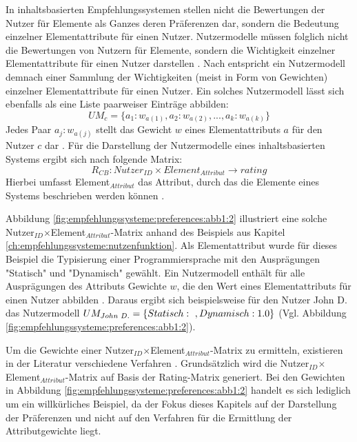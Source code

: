 In inhaltsbasierten Empfehlungssystemen stellen nicht die Bewertungen der Nutzer für Elemente als Ganzes deren Präferenzen dar, sondern die Bedeutung einzelner Elementattribute für einen Nutzer.
Nutzermodelle müssen folglich nicht die Bewertungen von Nutzern für Elemente, sondern die Wichtigkeit einzelner Elementattribute für einen Nutzer darstellen \cite[S. 42]{berkovsky:2:article}.
Nach \textcite[S. 42]{berkovsky:2:article} entspricht ein Nutzermodell demnach einer Sammlung der Wichtigkeiten (meist in Form von Gewichten) einzelner Elementattribute für einen Nutzer.
Ein solches Nutzermodell lässt sich ebenfalls als eine Liste paarweiser Einträge abbilden:
\begin{equation}\label{eq7}
    UM_{c} = \{a_{1}:w_{a(1)}, a_{2}:w_{a(2)}, ..., a_{k}:w_{a(k)}\}
\end{equation}
Jedes Paar $a_{j}:w_{a(j)}$ stellt das Gewicht $w$ eines Elementattributs $a$ für den Nutzer $c$ dar \cite[S. 42]{berkovsky:2:article}.
Für die Darstellung der Nutzermodelle eines inhaltsbasierten Systems ergibt sich nach \textcite[S. 251]{berkovsky:article} folgende Matrix:
\begin{equation}\label{eq8}
    R_{CB}: Nutzer_{ID} \times Element_{Attribut} \rightarrow rating
\end{equation}
Hierbei umfasst Element$_{Attribut}$ das Attribut, durch das die Elemente eines Systems beschrieben werden können \cite[S. 251]{berkovsky:article}.

Abbildung \ref{fig:empfehlungssysteme:preferences:abb1:2} illustriert eine solche Nutzer$_{ID}$$\times$Element$_{Attribut}$-Matrix anhand des Beispiels aus Kapitel \ref{ch:empfehlungssysteme:nutzenfunktion}.
Als Elementattribut wurde für dieses Beispiel die Typisierung einer Programmiersprache mit den Ausprägungen "Statisch" und "Dynamisch" gewählt.
Ein Nutzermodell enthält für alle Ausprägungen des Attributs Gewichte $w$, die den Wert eines Elementattributs für einen Nutzer abbilden \cite[S. 251]{berkovsky:article}.
Daraus ergibt sich beispielsweise für den Nutzer John D. das Nutzermodell $UM_{John\textnormal{ }D.} = \{Statisch:\textnormal{ }, Dynamisch: 1.0\}$ (Vgl. Abbildung \ref{fig:empfehlungssysteme:preferences:abb1:2}).

Um die Gewichte einer Nutzer$_{ID}$$\times$Element$_{Attribut}$-Matrix zu ermitteln, existieren in der Literatur verschiedene Verfahren \cite[S. 42]{berkovsky:2:article}.
Grundsätzlich wird die Nutzer$_{ID}$$\times$Element$_{Attribut}$-Matrix auf Basis der Rating-Matrix generiert.
Bei den Gewichten in Abbildung \ref{fig:empfehlungssysteme:preferences:abb1:2} handelt es sich lediglich um ein willkürliches Beispiel, da der Fokus dieses Kapitels auf der Darstellung der Präferenzen und nicht auf den Verfahren für die Ermittlung der Attributgewichte liegt.

